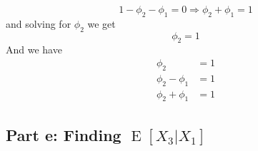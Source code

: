 \documentclass[11pt, oneside]{article}   	%
\newcommand{\E}{\operatorname{E}}
\begin{document}
\begin{equation}
1-\phi_{2}-\phi_{1}  = 0 \Longrightarrow \phi_{2}+\phi_{1} = 1
\end{equation}
and solving for $\phi_{2}$ we get
\begin{equation}
\phi_{2} = 1
\end{equation}
And we have 
\begin{equation}
\begin{aligned}
\phi_{2}& = 1\\
\phi_{2}-\phi_{1} &= 1\\
\phi_{2}+\phi_{1} &= 1
\end{aligned}
\end{equation}

\subsection{Part e: Finding $\E[X_{3}|X_{1}]$}
\end{document}
